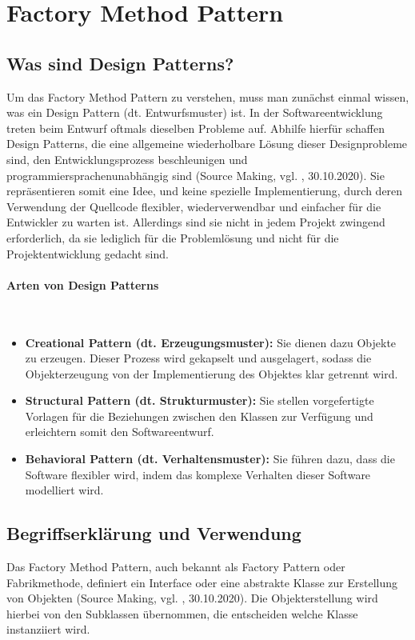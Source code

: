 \section{Factory Method Pattern}
\subsection{Was sind Design Patterns?}
Um das Factory Method Pattern zu verstehen, muss man zunächst einmal wissen, was ein Design Pattern (dt. Entwurfsmuster) ist. In der Softwareentwicklung treten beim Entwurf oftmals dieselben Probleme auf. Abhilfe hierfür schaffen Design Patterns, die eine allgemeine wiederholbare Lösung dieser Designprobleme sind, den Entwicklungsprozess beschleunigen und programmiersprachenunabhängig sind (Source Making, vgl. \cite{design_pattern_2020}, 30.10.2020). Sie repräsentieren somit eine Idee, und keine spezielle Implementierung, durch deren Verwendung der Quellcode flexibler, wiederverwendbar und einfacher für die Entwickler zu warten ist. Allerdings sind sie nicht in jedem Projekt zwingend erforderlich, da sie lediglich für die Problemlösung und nicht für die Projektentwicklung gedacht sind.

\paragraph{Arten von Design Patterns}\mbox{}\\

\begin{itemize}
	\item \textbf{Creational Pattern (dt. Erzeugungsmuster):} Sie dienen dazu Objekte zu erzeugen. Dieser Prozess wird gekapselt und ausgelagert, sodass die Objekterzeugung von der Implementierung des Objektes klar getrennt wird.
	\item \textbf{Structural Pattern (dt. Strukturmuster):} Sie stellen vorgefertigte Vorlagen für die Beziehungen zwischen den Klassen zur Verfügung und erleichtern somit den Softwareentwurf.
	\item \textbf{Behavioral Pattern (dt. Verhaltensmuster):} Sie führen dazu, dass die Software flexibler wird, indem das komplexe Verhalten dieser Software modelliert wird.
\end{itemize}

\subsection{Begriffserklärung und Verwendung}
Das Factory Method Pattern, auch bekannt als Factory Pattern oder Fabrikmethode, definiert ein Interface oder eine abstrakte Klasse zur Erstellung von Objekten (Source Making, vgl. \cite{factory_method_2020}, 30.10.2020). Die Objekterstellung wird hierbei von den Subklassen übernommen, die entscheiden welche Klasse instanziiert wird.


